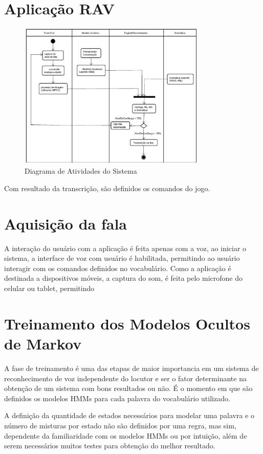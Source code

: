 \section{Aplicação RAV}
\begin{figure}[H]
\includegraphics[width=0.8\textwidth]{graficos/desenvolvimento_rav.eps}
\caption{Diagrama de Atividades do Sistema}
\end{figure}

Com resultado da transcrição, são definidos os comandos do jogo.

\section{Aquisição da fala}

A interação do usuário com a aplicação é feita apenas com a voz, ao iniciar o sistema, a interface de voz com usuário é habilitada, permitindo ao usuário interagir com os comandos definidos no vocabulário. Como a aplicação é destinada a dispositivos móveis, a captura do som, é feita pelo microfone do celular ou tablet, permitindo 


\section{Treinamento dos Modelos Ocultos de Markov}
A fase de treinamento é uma das etapas de maior importancia em um sistema de reconhecimento de voz independente do locutor e ser o fator determinante na obtenção de um sistema com bons resultados ou não. É o momento em que são definidos os modelos HMMs para cada palavra do vocabulário utilizado.

A definição da quantidade de estados necessários para modelar uma palavra e o número de misturas por estado não são definidos por uma regra, mas sim, dependente da familiaridade com os modelos HMMs ou por intuição, além de serem necessários muitos testes para obtenção do melhor resultado. 





 





